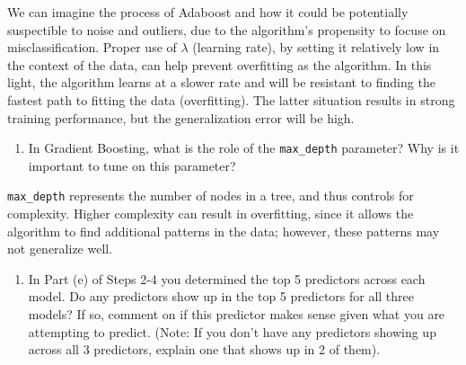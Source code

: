\documentclass[11pt]{article}
\providecommand{\tightlist}{%
      \setlength{\itemsep}{0pt}\setlength{\parskip}{0pt}}
\begin{document}
We can imagine the process of Adaboost and how it could be potentially
suspectible to noise and outliers, due to the algorithm's propensity to
focuse on misclassification. Proper use of \(\lambda\) (learning rate),
by setting it relatively low in the context of the data, can help
prevent overfitting as the algorithm. In this light, the algorithm
learns at a slower rate and will be resistant to finding the fastest
path to fitting the data (overfitting). The latter situation results in
strong training performance, but the generalization error will be high.

\begin{enumerate}
\def\labelenumi{\arabic{enumi})}
\setcounter{enumi}{6}
\tightlist
\item
  In Gradient Boosting, what is the role of the \texttt{max\_depth}
  parameter? Why is it important to tune on this parameter?
\end{enumerate}

\texttt{max\_depth} represents the number of nodes in a tree, and thus
controls for complexity. Higher complexity can result in overfitting,
since it allows the algorithm to find additional patterns in the data;
however, these patterns may not generalize well.

\begin{enumerate}
\def\labelenumi{\arabic{enumi})}
\setcounter{enumi}{7}
\tightlist
\item
  In Part (e) of Steps 2-4 you determined the top 5 predictors across
  each model. Do any predictors show up in the top 5 predictors for all
  three models? If so, comment on if this predictor makes sense given
  what you are attempting to predict. (Note: If you don't have any
  predictors showing up across all 3 predictors, explain one that shows
  up in 2 of them).
\end{enumerate}
\end{document}
